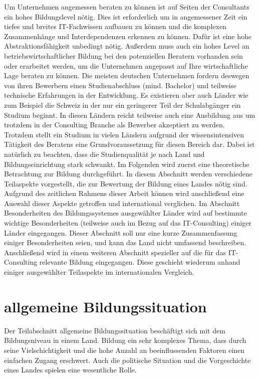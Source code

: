 Um Unternehmen angemessen beraten zu können ist auf Seiten der Consultants ein hohes Bildungslevel nötig. Dies ist erforderlich um in angemessener Zeit ein tiefes und breites IT-Fachwissen aufbauen zu können und die komplexen Zusammenhänge und Interdependenzen erkennen zu können. Dafür ist eine hohe Abstraktionsfähigkeit unbedingt nötig. Außerdem muss auch ein hohes Level an betriebswirtschaftlicher Bildung bei den potenziellen Beratern vorhanden sein oder erarbeitet werden, um die Unternehmen angepasst auf Ihre wirtschaftliche Lage beraten zu können.
Die meisten deutschen Unternehmen fordern deswegen von ihren Bewerbern einen Studienabschluss (mind. Bachelor) und teilweise technische Erfahrungen in der Entwicklung. Es existieren aber auch Länder wie zum Beispiel die Schweiz in der nur ein geringerer Teil der Schulabgänger ein Studium beginnt. In diesen Ländern reicht teilweise auch eine Ausbildung aus um trotzdem in der Consulting Branche als Bewerber akzeptiert zu werden.
Trotzdem stellt ein Studium in vielen Ländern aufgrund der wissensintensiven Tätigkeit des Beratens eine Grundvoraussetzung für diesen Bereich dar. Dabei ist natürlich zu beachten, dass die Studienqualität je nach Land und Bildungseinrichtung stark schwankt.
Im Folgenden wird zuerst eine theoretische Betrachtung zur Bildung durchgeführt. In diesem Abschnitt werden verschiedene Teilaspekte vorgestellt, die zur Bewertung der Bildung eines Landes nötig sind. Aufgrund des zeitlichen Rahmens dieser Arbeit können wird anschließend eine Auswahl dieser Aspekte getroffen und international verglichen.
 Im Abschnitt Besonderheiten des Bildungssystemes ausgewählter Länder wird auf bestimmte wichtige Besonderheiten (teilweise auch im Bezug auf das IT-Consulting) einiger Länder eingegangen. Dieser Abschnitt soll nur eine kurze Zusammenfassung einiger Besonderheiten seien, und kann das Land nicht umfassend beschreiben.
 Anschließend wird in einem weiteren Abschnitt spezieller auf die für das IT-Consulting relevante Bildung eingegangen. Diese geschieht wiederum anhand einiger ausgewählter Teilaspekte im internationalen Vergleich.


\section{allgemeine Bildungssituation}
Der Teilabschnitt allgemeine Bildungssituation beschäftigt sich mit dem Bildungsniveau in einem Land. Bildung ein sehr komplexes Thema, dass durch seine Vielschichtigkeit und die hohe Anzahl an beeinflussenden Faktoren einen einfachen Zugang erschwert. Auch die politische Situation und die Vorgeschichte eines Landes spielen eine wesentliche Rolle.

